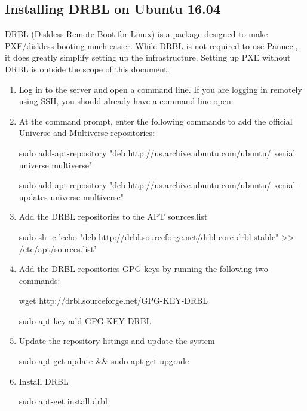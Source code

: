 \documentclass{article}
\begin{document}
\subsection{Installing DRBL on Ubuntu 16.04}
DRBL (Diskless Remote Boot for Linux) is a package designed to make PXE/diskless booting much easier.  While DRBL is not required to use Panucci, it does greatly simplify setting up the infrastructure.  Setting up PXE without DRBL is outside the scope of this document.
\begin{enumerate}
  \item Log in to the server and open a command line.  If you are logging in remotely using SSH, you should already have a command line open.
  \item At the command prompt, enter the following commands to add the official Universe and Multiverse repositories:
      \begin{spverbatim}
sudo add-apt-repository "deb http://us.archive.ubuntu.com/ubuntu/ xenial universe multiverse"
      \end{spverbatim}
      \begin{spverbatim}
sudo add-apt-repository "deb http://us.archive.ubuntu.com/ubuntu/ xenial-updates universe multiverse"
      \end{spverbatim}
    \item Add the DRBL repositories to the APT sources.list
      \begin{spverbatim}
sudo sh -c 'echo "deb http://drbl.sourceforge.net/drbl-core drbl stable" >> /etc/apt/sources.list'
      \end{spverbatim}
    \item Add the DRBL repositories GPG keys by running the following two commands:
      \begin{spverbatim}
wget http://drbl.sourceforge.net/GPG-KEY-DRBL
      \end{spverbatim}
      \begin{spverbatim}
sudo apt-key add GPG-KEY-DRBL
      \end{spverbatim}
    \item Update the repository listings and update the system
      \begin{spverbatim}
sudo apt-get update && sudo apt-get upgrade
      \end{spverbatim}
    \item Install DRBL
      \begin{spverbatim}
sudo apt-get install drbl
      \end{spverbatim}
\end{enumerate}
\end{document}
